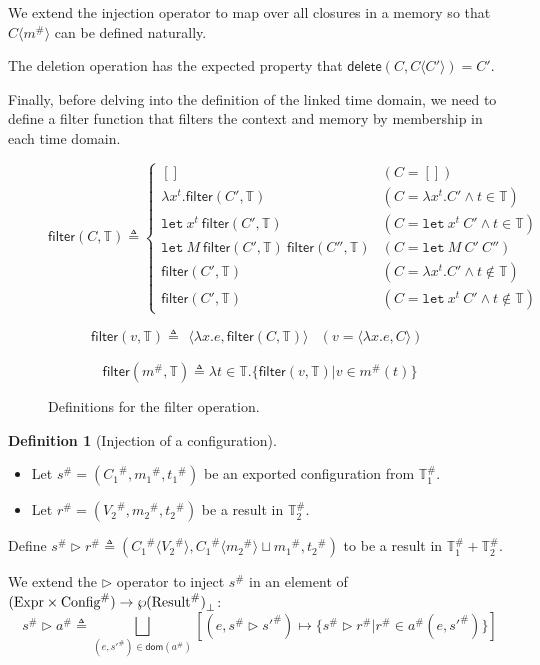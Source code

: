 \documentclass[acmsmall,screen,review]{acmart}
\theoremstyle{definition}
\newtheorem{definition}{Definition}[section]
\newcommand*{\A}[1]{{#1}^{\#}}
\newcommand*{\Expr}{\text{Expr}}
\newcommand*{\Time}{\mathbb{T}}
\newcommand*{\ATime}{\A{\Time}}
\newcommand*{\mem}{m}
\newcommand*{\AConfig}[1]{\A{\text{Config}}\vphantom{#1}}
\newcommand*{\AResult}[1]{\A{\text{Result}}\vphantom{#1}}
\newcommand*{\inject}[2]{{#1}\langle{#2}\rangle}
\newcommand*{\delete}{\mathsf{delete}}
\newcommand*{\filter}{\mathsf{filter}}
\newcommand*{\Let}{\mathtt{let}}
\begin{document}
We extend the injection operator to map over all closures in a memory so that $\inject{C}{\A\mem}$ can be defined naturally.

The deletion operation has the expected property that $\delete(C,\inject{C}{C'})=C'$.

Finally, before delving into the definition of the linked time domain, we need to define a filter function that filters the context and memory by membership in each time domain.

\begin{figure}[htb]
  \footnotesize
  \[
    \filter(C,\Time)\triangleq
    \begin{cases}
      []                                             & (C=[])                                   \\
      \lambda x^{t}.\filter(C',\Time)                & (C=\lambda x^{t}.C'\wedge t\in\Time)     \\
      \Let\:x^{t}\:\filter(C',\Time)                 & (C=\Let\:x^{t}\:C'\wedge t\in\Time)      \\
      \Let\:M\:\filter(C',\Time)\:\filter(C'',\Time) & (C=\Let\:M\:C'\:C'')                     \\
      \filter(C',\Time)                              & (C=\lambda x^{t}.C'\wedge t\not\in\Time) \\
      \filter(C',\Time)                              & (C=\Let\:x^{t}\:C'\wedge t\not\in\Time)
    \end{cases}
  \]

  \[
    \filter(v,\Time)\triangleq
    \begin{array}{ll}
      \langle\lambda x.e,\filter(C,\Time)\rangle & (v=\langle\lambda x.e,C\rangle)
    \end{array}
  \]

  \[
    \filter(\A\mem,\Time)\triangleq
    \lambda t\in\Time.\{\filter(v,\Time)|v\in\A{m}(t)\}
  \]
  \caption{Definitions for the filter operation.}
\end{figure}

\begin{definition}[Injection of a configuration]
  $\:$

  \begin{itemize}
    \item Let $\A{s}=(\A{C_1},\A{\mem_1},\A{t_1})$ be an exported configuration from $\ATime_1$.
    \item Let $\A{r}=(\A{V_2},\A{\mem_2},\A{t_2})$ be a result in $\ATime_2$.
  \end{itemize}

  Define $\A{s}\rhd\A{r}\triangleq(\A{C_1}\langle\A{V_2}\rangle,\A{C_1}\langle\A{\mem_2}\rangle\sqcup\A{\mem_1},\A{t_2})$ to be a result in $\ATime_1+\ATime_2$.

  We extend the $\rhd$ operator to inject $\A{s}$ in an element of $(\Expr\times\AConfig{\ATime})\rightarrow{\wp(\AResult{\ATime})}_{\bot}$:
  \[
    \A{s}\rhd\A{a}\triangleq\bigsqcup_{(e,\A{s'})\in\mathsf{dom}(\A{a})}[(e,\A{s}\rhd\A{s'})\mapsto\{\A{s}\rhd\A{r}|\A{r}\in\A{a}(e,\A{s'})\}]
  \]
\end{definition}
\end{document}
